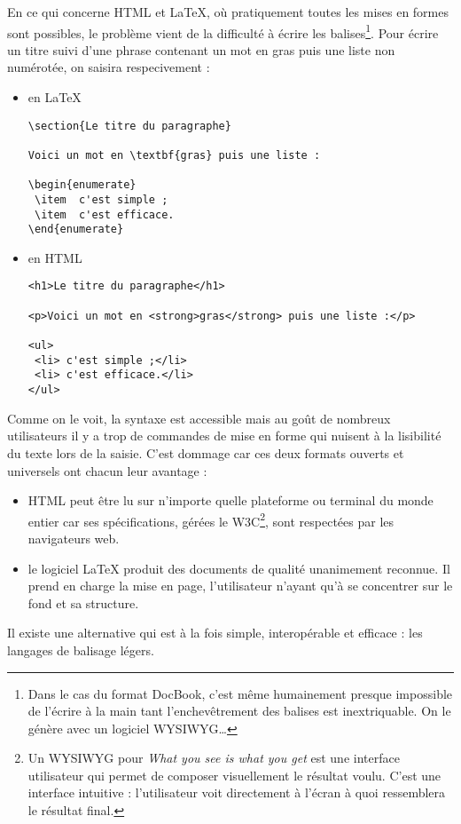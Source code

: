 \documentclass[]{article}
\begin{document}
En ce qui concerne HTML et LaTeX, où pratiquement toutes les mises en
formes sont possibles, le problème vient de la difficulté à écrire les
balises\footnote{Dans le cas du format DocBook, c'est même humainement
  presque impossible de l'écrire à la main tant l'enchevêtrement des
  balises est inextriquable. On le génère avec un logiciel
  WYSIWYG\ldots{}}. Pour écrire un titre suivi d'une phrase contenant un
mot en gras puis une liste non numérotée, on saisira respecivement :

\begin{itemize}
\item
  en LaTeX

\begin{verbatim}
\section{Le titre du paragraphe}

Voici un mot en \textbf{gras} puis une liste :

\begin{enumerate}
 \item  c'est simple ;
 \item  c'est efficace.
\end{enumerate}
\end{verbatim}
\item
  en HTML

\begin{verbatim}
<h1>Le titre du paragraphe</h1>

<p>Voici un mot en <strong>gras</strong> puis une liste :</p>

<ul>
 <li> c'est simple ;</li>
 <li> c'est efficace.</li>
</ul>
\end{verbatim}
\end{itemize}
Comme on le voit, la syntaxe est accessible mais au goût de nombreux
utilisateurs il y a trop de commandes de mise en forme qui nuisent à la
lisibilité du texte lors de la saisie. C'est dommage car ces deux
formats ouverts et universels ont chacun leur avantage :

\begin{itemize}
\item
  HTML peut être lu sur n'importe quelle plateforme ou terminal du monde
  entier car ses spécifications, gérées le W3C\footnote{Un WYSIWYG pour
    \emph{What you see is what you get} est une interface utilisateur
    qui permet de composer visuellement le résultat voulu. C'est une
    interface intuitive : l'utilisateur voit directement à l'écran à
    quoi ressemblera le résultat final.}, sont respectées par les
  navigateurs web.
\item
  le logiciel LaTeX produit des documents de qualité unanimement
  reconnue. Il prend en charge la mise en page, l'utilisateur n'ayant
  qu'à se concentrer sur le fond et sa structure.
\end{itemize}
Il existe une alternative qui est à la fois simple, interopérable et
efficace : les langages de balisage légers.
\end{document}
